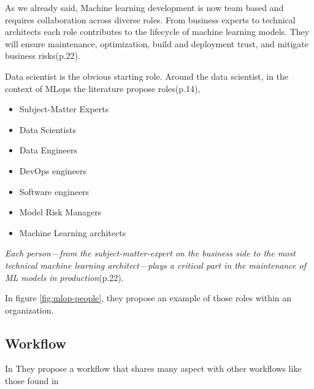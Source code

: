As we already said, Machine learning development is now team based and requires collaboration across diverse roles.
From business experts to technical architects each role contributes to the lifecycle of machine learning models.
They will ensure maintenance, optimization, build and deployment trust, and mitigate business risks\cite{treveil2020introducing}(p.22).

Data scientist is the obvious starting role.
Around the data scientist, in the context of MLops the literature
propose roles\cite{treveil2020introducing}(p.14),
\begin{itemize}
    \item Subject-Matter Experts
    \item Data Scientists
    \item Data Engineers
    \item DevOps engineers
    \item Software engineers
    \item Model Risk Managers
    \item Machine Learning architects
\end{itemize}

\textit{Each person—from the subject-matter-expert on the business side to the most
technical machine learning architect—plays a critical part in the maintenance of ML
models in production}\cite{treveil2020introducing}(p.22).

In figure \ref{fig:mlop-people}, they propose an example of those roles within an organization.




\subsection{Workflow}\label{subsec:workflow}

In\cite{9792270} They propose a workflow that shares many aspect with other workflows like those found in\cite{treveil2020introducing,gift2021practical}


